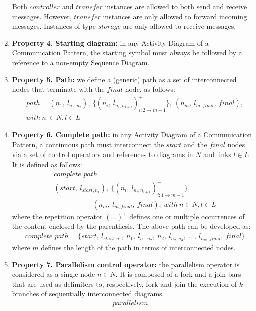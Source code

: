 \documentclass{llncs}
\begin{document}
\begin{subappendices}
\begin{enumerate}
	Both $controller$ and $transfer$ instances are allowed to both send and receive messages. However, $transfer$
	instances are only allowed to forward incoming messages. Instances of type $storage$ are only allowed to receive
	messages.
	\item \textbf{Property 4. Starting diagram:} in any Activity Diagram of a Communication Pattern, the starting symbol
	must always be followed by a reference to a non-empty Sequence Diagram.
	\item \textbf{Property 5. Path:} we define a (generic) path as a set of interconnected nodes that terminate with the
	$final$ node, as follows:
		\begin{align*}
		&path = (n_1,\ l_{n_1,n_2}),\ \{(n_i,\ l_{n_i,n_{i+1}})^{+}_{i:2 \rightarrow m-1}\},\ (n_m,\ l_{m,final},\ final),\\
		&with\ n\ \in N, l \in L
		\end{align*}
	\item \textbf{Property 6. Complete path:} in any Activity Diagram of a Communication Pattern, a continuous path
	must interconnect the $start$ and the $final$ nodes via a set of control operators and references to diagrams in $N$
	and links $l \in L$. It is defined as follows:
		\begin{align*}
		&complete\_path =\\
		&(start,\ l_{start,n_1}),\ \{(n_i,\ l_{n_i,n_{i+1}})^{+}_{i:1 \rightarrow m-1}\},\\
		&\ \ \ \ \ \ \ \ \ \ \ \ \ \ \ \ \ \ \ \ \ \ \ \ \ (n_m,\ l_{m,final},\ final),\ with\ n \in N, l \in L
		\end{align*}
	where the repetition operator $(...)^{+}$ defines one or multiple occurrences of the content enclosed by the
	parenthesis. The above path can be developed as:
		\begin{align*}
		&complete\_path = \{start,\ l_{start,n_1},\ n_1,\ l_{n_1,n_2},\ n_2,\ l_{n_2,n_3},\ ...,\ l_{n_m,final},\ final\}
		\end{align*}
	where $m$ defines the length of the path in terms of interconnected nodes.
	\item \textbf{Property 7. Parallelism control operator:} the parallelism operator is considered as a single node $n
	\in N$. It is composed of a fork and a join bars that are used as delimiters to, respectively, fork and join the
	execution of $k$ branches of sequentially interconnected diagrams.
		\begin{align*}
		&parallelism =\\

\end{align*}
\end{enumerate}
\end{subappendices}
\end{document}

